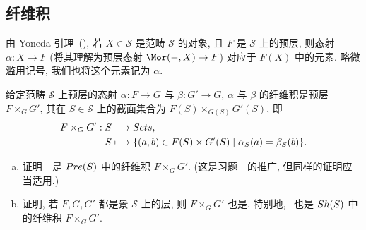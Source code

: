 \subsection{纤维积}\label{src:3.3.2-subsection}
由 Yoneda 引理~(), 若 $X\in\mathcal S$ 是范畴 $\mathcal S$ 的对象, 且 $F$ 是 $\mathcal S$ 上的预层, 则态射 $\alpha:X\to F$ (将其理解为预层态射 $\Mor(-,X)\to F$) 对应于 $F(X)$ 中的元素. 略微滥用记号, 我们也将这个元素记为 $\alpha$.
\begin{definition}\label{src:3.3.12}
给定范畴 $\mathcal S$ 上预层的态射 $\alpha:F\to G$ 与 $\beta:G'\to G$, $\alpha$ 与 $\beta$ 的纤维积是预层 $F\times_G G'$, 其在 $S\in\mathcal S$ 上的截面集合为 $F(S)\times_{G(S)}G'(S)$, 即
\begin{equation}\label{src:3.3.13}
\begin{aligned}
F\times_G G':S&\longrightarrow Sets,\\
S&\longmapsto\{(a,b)\in F(S)\times G'(S)\mid\alpha_S(a)=\beta_S(b)\}.
\end{aligned}
\end{equation}
\end{definition}
\begin{exercise}\label{src:3.3.14}
\begin{enumerate}[(a)]
\item 证明~~是 $Pre(S)$ 中的纤维积 $F\times_G G'$. (这是习题~~的推广, 但同样的证明应当适用.)
\item 证明, 若 $F,G,G'$ 都是景 $\mathcal S$ 上的层, 则 $F\times_G G'$ 也是. 特别地, ~也是 $Sh(S)$ 中的纤维积 $F\times_G G'$.
\end{enumerate}
\end{exercise}

